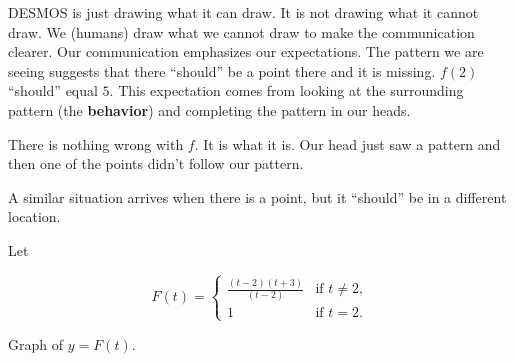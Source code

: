 \documentclass{ximera}
\begin{document}
DESMOS is just drawing what it can draw.  It is not drawing what it cannot draw. We (humans) draw what we cannot draw to make the communication clearer. Our communication emphasizes our expectations. The pattern we are seeing suggests that there ``should'' be a point there and it is missing. $f(2)$ ``should'' equal $5$.  This expectation comes from looking at the surrounding pattern (the \textbf{\textcolor{purple!85!blue}{behavior}}) and completing the pattern in our heads. 

There is nothing wrong with $f$.  It is what it is.  Our head just saw a pattern and then one of the points didn't follow our pattern.


A similar situation arrives when there is a point, but it ``should'' be in a different location.







Let 


\[
F(t) = 
\begin{cases}
  \frac{(t-2)(t+3)}{(t-2)} &\text{if $t \ne 2$,}\\
  1 &\text{if $t = 2$}.
\end{cases}
\]




Graph of $y = F(t)$.

\begin{image}
\end{image}
\end{document}
